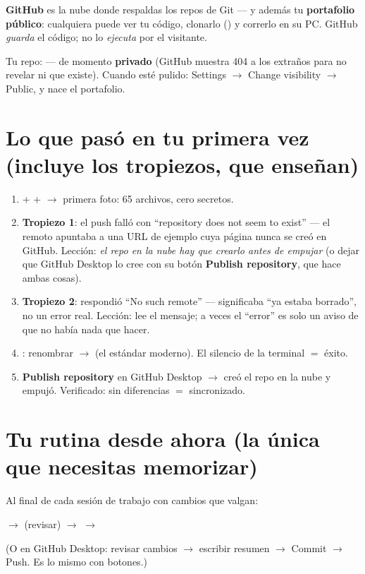 \documentclass[11pt,a4paper]{article}
\begin{document}
\textbf{GitHub} es la nube donde respaldas los repos de Git — y además tu \textbf{portafolio
público}: cualquiera puede ver tu código, clonarlo () y correrlo en su PC.
GitHub \emph{guarda} el código; no lo \emph{ejecuta} por el visitante.

Tu repo:  — de momento \textbf{privado} (GitHub
muestra 404 a los extraños para no revelar ni que existe). Cuando esté pulido:
Settings $\rightarrow$ Change visibility $\rightarrow$ Public, y nace el portafolio.

\section{Lo que pasó en tu primera vez (incluye los tropiezos, que enseñan)}

\begin{enumerate}
  \item {} +  +  $\rightarrow$ primera
        foto: 65 archivos, cero secretos.
  \item \textbf{Tropiezo 1}: el push falló con ``repository does not seem to exist'' — el
        remoto apuntaba a una URL de ejemplo cuya página nunca se creó en GitHub. Lección:
        \emph{el repo en la nube hay que crearlo antes de empujar} (o dejar que GitHub
        Desktop lo cree con su botón \textbf{Publish repository}, que hace ambas cosas).
  \item \textbf{Tropiezo 2}:  respondió ``No such remote''
        — significaba ``ya estaba borrado'', no un error real. Lección: lee el mensaje;
        a veces el ``error'' es solo un aviso de que no había nada que hacer.
  \item {}: renombrar  $\rightarrow$ 
        (el estándar moderno). El silencio de la terminal $=$ éxito.
  \item \textbf{Publish repository} en GitHub Desktop $\rightarrow$ creó el repo en la nube y
        empujó. Verificado:  sin diferencias $=$ sincronizado.
\end{enumerate}

\section{Tu rutina desde ahora (la única que necesitas memorizar)}

Al final de cada sesión de trabajo con cambios que valgan:
\begin{center}
 \quad$\rightarrow$\quad {} (revisar) \quad$\rightarrow$\quad
{} \quad$\rightarrow$\quad {}
\end{center}
(O en GitHub Desktop: revisar cambios $\rightarrow$ escribir resumen $\rightarrow$ Commit
$\rightarrow$ Push. Es lo mismo con botones.)
\end{document}
